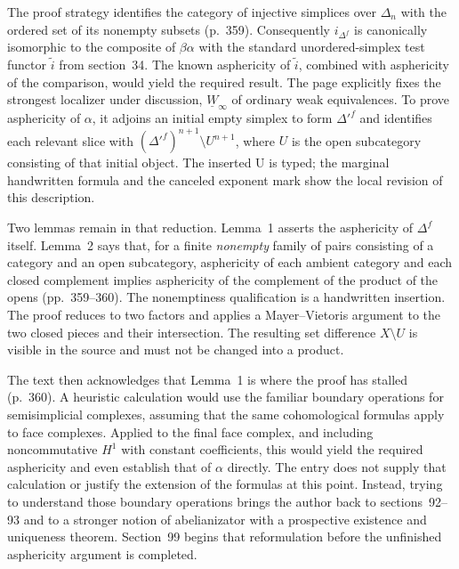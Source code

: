 The proof strategy identifies the category of injective simplices over $\Delta_n$ with the ordered set of its nonempty subsets (p.~359). Consequently $i_{\Delta^f}$ is canonically isomorphic to the composite of $\beta\alpha$ with the standard unordered-simplex test functor $\widetilde i$ from section~34. The known asphericity of $\widetilde i$, combined with asphericity of the comparison, would yield the required result. The page explicitly fixes the strongest localizer under discussion, $\underline W_{\infty}$ of ordinary weak equivalences. To prove asphericity of $\alpha$, it adjoins an initial empty simplex to form $\Delta'^f$ and identifies each relevant slice with $(\Delta'^f)^{n+1}\setminus U^{n+1}$, where $U$ is the open subcategory consisting of that initial object. The inserted U is typed; the marginal handwritten formula and the canceled exponent mark show the local revision of this description.

Two lemmas remain in that reduction. Lemma~1 asserts the asphericity of $\Delta^f$ itself. Lemma~2 says that, for a finite \emph{nonempty} family of pairs consisting of a category and an open subcategory, asphericity of each ambient category and each closed complement implies asphericity of the complement of the product of the opens (pp.~359--360). The nonemptiness qualification is a handwritten insertion. The proof reduces to two factors and applies a Mayer--Vietoris argument to the two closed pieces and their intersection. The resulting set difference $X\setminus U$ is visible in the source and must not be changed into a product.

The text then acknowledges that Lemma~1 is where the proof has stalled (p.~360). A heuristic calculation would use the familiar boundary operations for semisimplicial complexes, assuming that the same cohomological formulas apply to face complexes. Applied to the final face complex, and including noncommutative $H^1$ with constant coefficients, this would yield the required asphericity and even establish that of $\alpha$ directly. The entry does not supply that calculation or justify the extension of the formulas at this point. Instead, trying to understand those boundary operations brings the author back to sections~92--93 and to a stronger notion of abelianizator with a prospective existence and uniqueness theorem. Section~99 begins that reformulation before the unfinished asphericity argument is completed.

